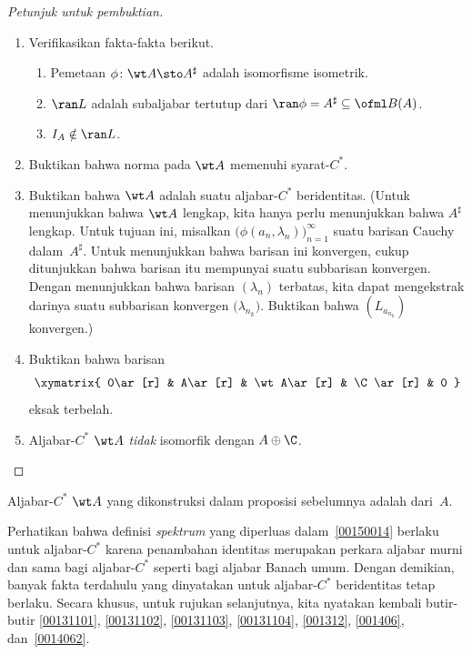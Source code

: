 \begin{proof}[\emph{Petunjuk untuk pembuktian}]
\begin{enumerate}
    \item Verifikasikan fakta-fakta berikut.
      \begin{enumerate}
        \item Pemetaan $\phi\colon \wt A \sto A^\sharp$ adalah isomorfisme isometrik.
        \item $\ran L$ adalah subaljabar tertutup dari
$\ran \phi = A^\sharp \subseteq \ofml B(A)$.
        \item $I_A \notin \ran L$.
      \end{enumerate}
    \item Buktikan bahwa norma pada $\wt A$ memenuhi syarat-$C^*$.
    \item Buktikan bahwa $\wt A$ adalah suatu aljabar-$C^*$ beridentitas. (Untuk
menunjukkan bahwa $\wt A$ lengkap, kita hanya perlu menunjukkan bahwa $A^\sharp$ lengkap.
Untuk tujuan ini, misalkan $\bigl(\phi(a_n,\lambda_n)\bigr)_{n=1}^\infty$ suatu barisan
Cauchy dalam~$A^\sharp$. Untuk menunjukkan bahwa barisan ini konvergen, cukup ditunjukkan
bahwa barisan itu mempunyai suatu subbarisan konvergen. Dengan menunjukkan bahwa barisan
$(\lambda_n)$ terbatas, kita dapat mengekstrak darinya suatu subbarisan konvergen
$\bigl(\lambda_{n_k}\bigr)$. Buktikan bahwa $(L_{a_{n_k}})$ konvergen.)
    \item Buktikan bahwa barisan
        \begin{equation}\xymatrix{
     0\ar[r] & A\ar[r] & \wt A\ar[r] & \C\ar[r] & 0
        }\end{equation}
eksak terbelah.
    \item Aljabar-$C^*$ $\wt A$ \emph{tidak} isomorfik dengan $A \oplus \C$.
\end{enumerate}  \ns
\end{proof}

\begin{defn}\label{00152131} Aljabar-$C^*$ $\wt A$ yang dikonstruksi dalam proposisi
sebelumnya adalah
 dari~$A$.
\end{defn}

Perhatikan bahwa definisi \emph{spektrum} yang diperluas dalam~\ref{00150014} berlaku untuk
aljabar-$C^*$ karena penambahan identitas merupakan perkara aljabar murni dan sama
bagi aljabar-$C^*$ seperti bagi aljabar Banach umum. Dengan demikian, banyak fakta
terdahulu yang dinyatakan untuk aljabar-$C^*$ beridentitas tetap berlaku. Secara khusus,
untuk rujukan selanjutnya, kita nyatakan kembali butir-butir \ref{00131101},
\ref{00131102}, \ref{00131103}, \ref{00131104}, \ref{001312}, \ref{001406},
dan~\ref{0014062}.

